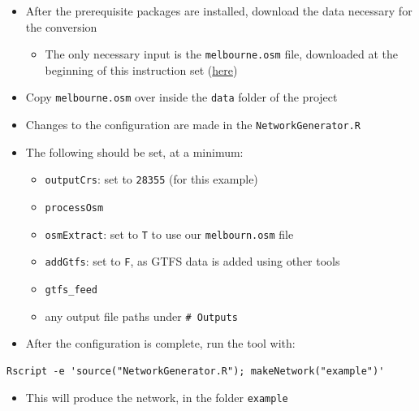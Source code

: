 \documentclass[11pt]{article}
\begin{document}
\begin{itemize}
\item After the prerequisite packages are installed, download the data necessary for the conversion
\begin{itemize}
\item The only necessary input is the \texttt{melbourne.osm} file, downloaded at the beginning of this instruction set (\hyperref[sec:org387c552]{here})
\end{itemize}
\item Copy \texttt{melbourne.osm} over inside the \texttt{data} folder of the project
\end{itemize}

\begin{itemize}
\item Changes to the configuration are made in the \texttt{NetworkGenerator.R}
\item The following should be set, at a minimum:
\begin{itemize}
\item \texttt{outputCrs}: set to \texttt{28355} (for this example)
\item \texttt{processOsm}
\item \texttt{osmExtract}: set to \texttt{T} to use our \texttt{melbourn.osm} file
\item \texttt{addGtfs}: set to \texttt{F}, as GTFS data is added using other tools
\item \texttt{gtfs\_feed}
\item any output file paths under \texttt{\# Outputs}
\end{itemize}
\end{itemize}

\begin{itemize}
\item After the configuration is complete, run the tool with:
\end{itemize}
\begin{verbatim}
Rscript -e 'source("NetworkGenerator.R"); makeNetwork("example")'
\end{verbatim}
\begin{itemize}
\item This will produce the network, in the folder \texttt{example}
\end{itemize}
\end{document}
